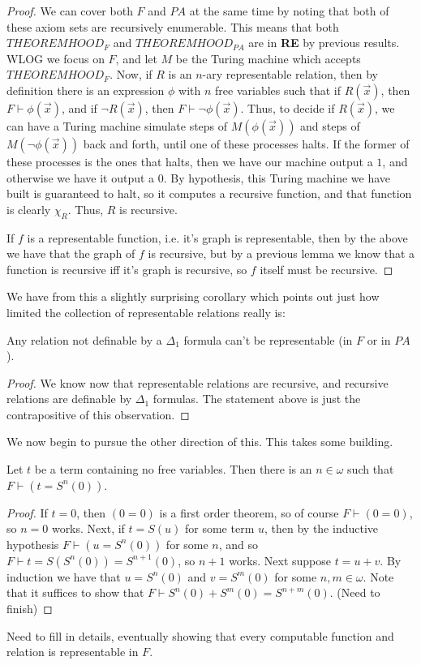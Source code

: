\begin{proof}
    We can cover both $F$ and $PA$ at the same time by noting that both of these axiom sets are recursively enumerable. This means that both $THEOREMHOOD_F$ and $THEOREMHOOD_{PA}$ are in \textbf{RE} by previous results. WLOG we focus on $F$, and let $M$ be the Turing machine which accepts $THEOREMHOOD_F$. Now, if $R$ is an $n$-ary representable relation, then by definition there is an expression $\phi$ with $n$ free variables such that if $R(\vec{x})$, then $F \vdash \phi(\vec{x})$, and if $\neg R(\vec{x})$, then $F \vdash \neg \phi(\vec{x})$. Thus, to decide if $R(\vec{x})$, we can have a Turing machine simulate steps of $M(\phi(\vec{x}))$ and steps of $M(\neg \phi(\vec{x}))$ back and forth, until one of these processes halts. If the former of these processes is the ones that halts, then we have our machine output a $1$, and otherwise we have it output a $0$. By hypothesis, this Turing machine we have built is guaranteed to halt, so it computes a recursive function, and that function is clearly $\chi_R$. Thus, $R$ is recursive.
    \par If $f$ is a representable function, i.e. it's graph is representable, then by the above we have that the graph of $f$ is recursive, but by a previous lemma we know that a function is recursive iff it's graph is recursive, so $f$ itself must be recursive.
\end{proof}
We have from this a slightly surprising corollary which points out just how limited the collection of representable relations really is:
\begin{corollary}
   Any relation not definable by a $\Delta_1$ formula can't be representable (in $F$ or in $PA$). 
\end{corollary}
\begin{proof}
    We know now that representable relations are recursive, and recursive relations are definable by $\Delta_1$ formulas. The statement above is just the contrapositive of this observation.
\end{proof}
We now begin to pursue the other direction of this. This takes some building.
\begin{lemma}
    Let $t$ be a term containing no free variables. Then there is an $n \in \mathbb{\omega}$ such that $F \vdash (t = S^n(0))$.
\end{lemma}
\begin{proof}
    If $t = 0$, then $(0 = 0)$ is a first order theorem, so of course $F \vdash (0=0)$, so $n=0$ works. Next, if $t = S(u)$ for some term $u$, then by the inductive hypothesis $F \vdash (u = S^n(0))$ for some $n$, and so $F \vdash t = S(S^n(0)) = S^{n+1}(0)$, so $n+1$ works. Next suppose $t = u+v$. By induction we have that $u = S^n(0)$ and $v = S^m(0)$ for some $n,m \in \omega$. Note that it suffices to show that $F \vdash S^n(0)+S^m(0) = S^{n+m}(0)$. (Need to finish)
\end{proof}
Need to fill in details, eventually showing that every computable function and relation is representable in $F$.

